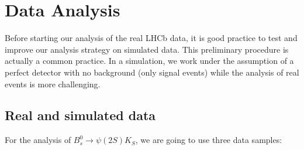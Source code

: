 \chapter{Data Analysis}\label{chap:02}

Before starting our analysis of the real LHCb data, it is good practice to test and improve our analysis strategy on simulated data. This preliminary procedure is actually a common practice. In a simulation, we work under the assumption of a perfect detector with no background (only signal events) while the analysis of real events is more challenging.

\section{Real and simulated data}

\begin{figure}[H]
    \centering
    \hfill %
    \hfill
    \caption{}
    \label{predatasets}
\end{figure}

For the analysis of $B_{s}^{0}\rightarrow \psi(2S)K_{S}$, we are going to use three data samples:

